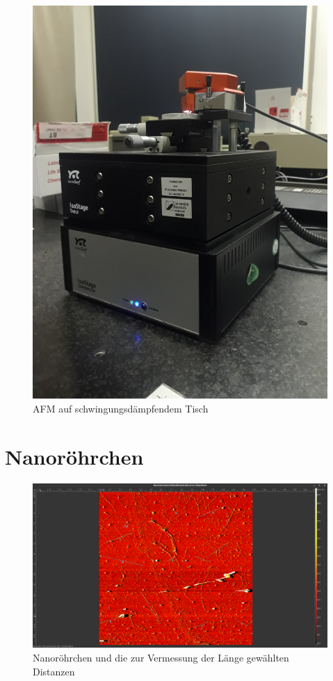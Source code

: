 \begin{figure}[h]
    \centering
    \includegraphics[width = \linewidth, angle = -90]{Bilder/Aufbau/20210920093631.jpg}
    \caption{AFM auf schwingungsdämpfendem Tisch}
\end{figure}

\clearpage



\section{Nanoröhrchen}
\begin{figure}[h]
    \centering
    \includegraphics[width = \linewidth]{Bilder/Nanotubes/NanoTube15umLaenge2.png}
    \caption{Nanoröhrchen und die zur Vermessung der Länge gewählten Distanzen}
    \label{Nanotube20Mess}
\end{figure}

